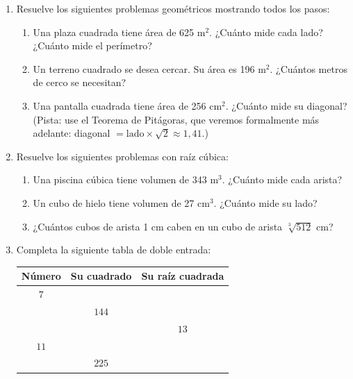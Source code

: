 \documentclass[11pt, letterpaper]{article}
\begin{document}
\begin{enumerate}[label=\textbf{\arabic*.}, leftmargin=*, resume]
  \item Resuelve los siguientes problemas geométricos mostrando todos los pasos:
  \begin{enumerate}[label=\alph*)]
    \item Una plaza cuadrada tiene área de 625 m$^2$. ¿Cuánto mide cada lado? ¿Cuánto mide el perímetro?
    \item Un terreno cuadrado se desea cercar. Su área es 196 m$^2$. ¿Cuántos metros de cerco se necesitan?
    \item Una pantalla cuadrada tiene área de 256 cm$^2$. ¿Cuánto mide su diagonal? (Pista: use el Teorema de Pitágoras, que veremos formalmente más adelante: diagonal $= \text{lado} \times \sqrt{2} \approx 1{,}41$.)
  \end{enumerate}

  \item Resuelve los siguientes problemas con raíz cúbica:
  \begin{enumerate}[label=\alph*)]
    \item Una piscina cúbica tiene volumen de 343 m$^3$. ¿Cuánto mide cada arista?
    \item Un cubo de hielo tiene volumen de 27 cm$^3$. ¿Cuánto mide su lado?
    \item ¿Cuántos cubos de arista 1 cm caben en un cubo de arista $\sqrt[3]{512}$ cm?
  \end{enumerate}

  \item Completa la siguiente tabla de doble entrada:

  \begin{center}
  \renewcommand{\arraystretch}{1.4}
  \begin{tabular}{|c|c|c|}
  \hline
  \textbf{Número} & \textbf{Su cuadrado} & \textbf{Su raíz cuadrada}\\
  \hline
  $7$ & \quad\quad & \quad\quad\\
  \hline
  \quad\quad & $144$ & \quad\quad\\
  \hline
  \quad\quad & \quad\quad & $13$\\
  \hline
  $11$ & \quad\quad & \quad\quad\\
  \hline
  \quad\quad & $225$ & \quad\quad\\
  \hline
  \end{tabular}
  \end{center}
\end{enumerate}
\end{document}
